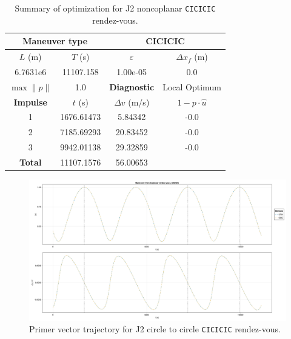 \begin{table}[htpb]
    \centering
    \begin{tabular}{cccc} \toprule
    \multicolumn{2}{c}{\textbf{Maneuver type}} & \multicolumn{2}{c}{CICICIC} \\ \midrule
    \(L\) (m) & \(T\) (s) & \(\varepsilon\) & \(\Delta x_{f}\) (m)    \\ \midrule
    6.7631e6          & 11107.158          & 1.00e-05                & 0.0                        \\ \midrule
    \(\max \lVert p \rVert\) & 1.0     & \textbf{Diagnostic}   & Local Optimum        \\ \midrule
    \textbf{Impulse} & \(t\) (s) & \(\Delta v\) (m/s) & \(1 - p \cdot \hat{u}\) \\ \midrule
    1                 & 1676.61473          & 5.84342             & -0.0                    \\
    2                 & 7185.69293          & 20.83452             & -0.0                    \\
    3                 & 9942.01138          & 29.32859             & -0.0                    \\\midrule
    \textbf{Total}   & 11107.1576          & 56.00653             &                     \\ \bottomrule   
    \end{tabular}
    \caption{Summary of optimization for J2 noncoplanar \texttt{CICICIC} rendez-vous.}
    \label{tab:j2_ncop_CICICIC_tab}
\end{table}

\begin{figure}[htbp]
    \centering
    \includegraphics[width=\linewidth]{../results/j2/ipv_noncop/CICICIC_primer_vector.png}
    \caption{Primer vector trajectory for J2 circle to circle \texttt{CICICIC} rendez-vous.}
    \label{fig:j2_ncop_CICICIC_pv}
\end{figure}



